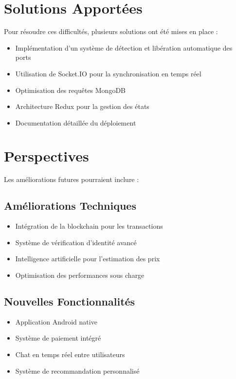 \section{Solutions Apportées}
Pour résoudre ces difficultés, plusieurs solutions ont été mises en place :

\begin{itemize}
    \item Implémentation d'un système de détection et libération automatique des ports
    \item Utilisation de Socket.IO pour la synchronisation en temps réel
    \item Optimisation des requêtes MongoDB
    \item Architecture Redux pour la gestion des états
    \item Documentation détaillée du déploiement
\end{itemize}

\section{Perspectives}
Les améliorations futures pourraient inclure :

\subsection{Améliorations Techniques}
\begin{itemize}
    \item Intégration de la blockchain pour les transactions
    \item Système de vérification d'identité avancé
    \item Intelligence artificielle pour l'estimation des prix
    \item Optimisation des performances sous charge
\end{itemize}

\subsection{Nouvelles Fonctionnalités}
\begin{itemize}
    \item Application Android native
    \item Système de paiement intégré
    \item Chat en temps réel entre utilisateurs
    \item Système de recommandation personnalisé
\end{itemize}

